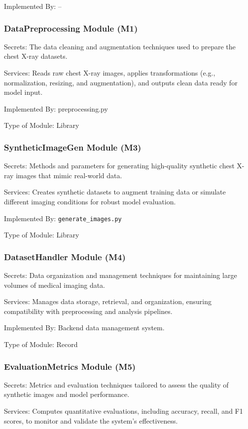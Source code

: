 \documentclass[12pt, titlepage]{article}
\begin{document}
Implemented By: --

\subsubsection{DataPreprocessing Module (M1)}
Secrets: The data cleaning and augmentation techniques used to prepare the chest X-ray datasets.

Services: Reads raw chest X-ray images, applies transformations (e.g., normalization, resizing, and augmentation), and outputs clean data ready for model input.

Implemented By: preprocessing.py

Type of Module: Library

\subsubsection{SyntheticImageGen Module (M3)}
Secrets: Methods and parameters for generating high-quality synthetic chest X-ray images that mimic real-world data.

Services: Creates synthetic datasets to augment training data or simulate different imaging conditions for robust model evaluation.

Implemented By: \verb|generate_images.py|

Type of Module: Library

\subsubsection{DatasetHandler Module (M4)}
Secrets: Data organization and management techniques for maintaining large volumes of medical imaging data.

Services: Manages data storage, retrieval, and organization, ensuring compatibility with preprocessing and analysis pipelines.

Implemented By: Backend data management system.

Type of Module: Record

\subsubsection{EvaluationMetrics Module (M5)}
Secrets: Metrics and evaluation techniques tailored to assess the quality of synthetic images and model performance.

Services: Computes quantitative evaluations, including accuracy, recall, and F1 scores, to monitor and validate the system’s effectiveness.
\end{document}
